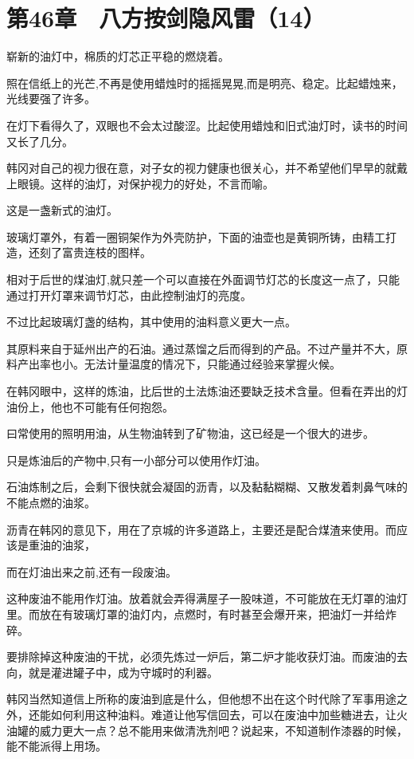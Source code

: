 \section{第46章　八方按剑隐风雷（14）}

崭新的油灯中，棉质的灯芯正平稳的燃烧着。

照在信纸上的光芒,不再是使用蜡烛时的摇摇晃晃,而是明亮、稳定。比起蜡烛来，光线要强了许多。

在灯下看得久了，双眼也不会太过酸涩。比起使用蜡烛和旧式油灯时，读书的时间又长了几分。

韩冈对自己的视力很在意，对子女的视力健康也很关心，并不希望他们早早的就戴上眼镜。这样的油灯，对保护视力的好处，不言而喻。

这是一盏新式的油灯。

玻璃灯罩外，有着一圈铜架作为外壳防护，下面的油壶也是黄铜所铸，由精工打造，还刻了富贵连枝的图样。

相对于后世的煤油灯,就只差一个可以直接在外面调节灯芯的长度这一点了，只能通过打开灯罩来调节灯芯，由此控制油灯的亮度。

不过比起玻璃灯盏的结构，其中使用的油料意义更大一点。

其原料来自于延州出产的石油。通过蒸馏之后而得到的产品。不过产量并不大，原料产出率也小。无法计量温度的情况下，只能通过经验来掌握火候。

在韩冈眼中，这样的炼油，比后世的土法炼油还要缺乏技术含量。但看在弄出的灯油份上，他也不可能有任何抱怨。

曰常使用的照明用油，从生物油转到了矿物油，这已经是一个很大的进步。

只是炼油后的产物中,只有一小部分可以使用作灯油。

石油炼制之后，会剩下很快就会凝固的沥青，以及黏黏糊糊、又散发着刺鼻气味的不能点燃的油浆。

沥青在韩冈的意见下，用在了京城的许多道路上，主要还是配合煤渣来使用。而应该是重油的油浆，

而在灯油出来之前,还有一段废油。

这种废油不能用作灯油。放着就会弄得满屋子一股味道，不可能放在无灯罩的油灯里。而放在有玻璃灯罩的油灯内，点燃时，有时甚至会爆开来，把油灯一并给炸碎。

要排除掉这种废油的干扰，必须先炼过一炉后，第二炉才能收获灯油。而废油的去向，就是灌进罐子中，成为守城时的利器。

韩冈当然知道信上所称的废油到底是什么，但他想不出在这个时代除了军事用途之外，还能如何利用这种油料。难道让他写信回去，可以在废油中加些糖进去，让火油罐的威力更大一点？总不能用来做清洗剂吧？说起来，不知道制作漆器的时候，能不能派得上用场。

